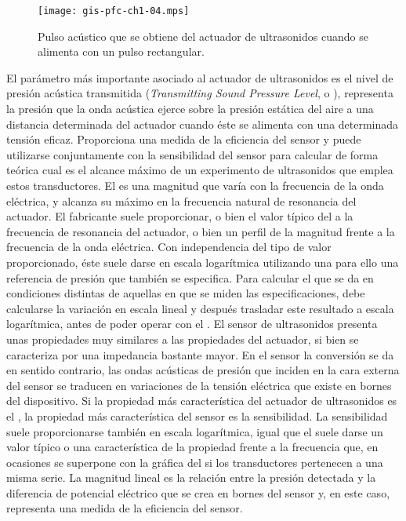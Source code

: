 \begin{figure}
	\begin{center}
		\texttt{[image: gis-pfc-ch1-04.mps]}
	\end{center}
	\caption[Pulso acústico generado por el actuador de
	ultrasonidos]{Pulso acústico que se obtiene del actuador de
	ultrasonidos cuando se alimenta con un pulso rectangular.}
	\label{fig:pulse}
\end{figure}

El parámetro más importante asociado al actuador de ultrasonidos es el
nivel de presión acústica transmitida (\emph{Transmitting Sound Pressure
Level}, o ), representa la presión que la onda acústica ejerce
sobre la presión estática del aire a una distancia determinada del actuador
cuando éste se alimenta con una determinada tensión eficaz. Proporciona una
medida de la eficiencia del sensor y puede utilizarse conjuntamente con la
sensibilidad del sensor para calcular de forma teórica cual es el alcance
máximo de un experimento de ultrasonidos que emplea estos transductores. El
 es una magnitud que varía con la frecuencia de la onda eléctrica,
y alcanza su máximo en la frecuencia natural de resonancia del actuador. El
fabricante suele proporcionar, o bien el valor típico del  a la
frecuencia de resonancia del actuador, o bien un perfil de la magnitud
frente a la frecuencia de la onda eléctrica. Con independencia del tipo de
valor proporcionado, éste suele darse en escala logarítmica utilizando una
para ello una referencia de presión que también se especifica. Para
calcular el  que se da en condiciones distintas de aquellas en que
se miden las especificaciones, debe calcularse la variación en escala
lineal y después trasladar este resultado a escala logarítmica, antes de
poder operar con el . El sensor de ultrasonidos presenta unas
propiedades muy similares a las propiedades del actuador, si bien se
caracteriza por una impedancia bastante mayor. En el sensor la conversión
se da en sentido contrario, las ondas acústicas de presión que inciden en
la cara externa del sensor se traducen en variaciones de la tensión
eléctrica que existe en bornes del dispositivo. Si la propiedad más
característica del actuador de ultrasonidos es el , la propiedad
más característica del sensor es la sensibilidad. La sensibilidad suele
proporcionarse también en escala logarítmica, igual que el  suele
darse un valor típico o una característica de la propiedad frente a la
frecuencia que, en ocasiones se superpone con la gráfica del  si
los transductores pertenecen a una misma serie. La magnitud lineal es la
relación entre la presión detectada y la diferencia de potencial eléctrico
que se crea en bornes del sensor y, en este caso, representa una medida de
la eficiencia del sensor.
